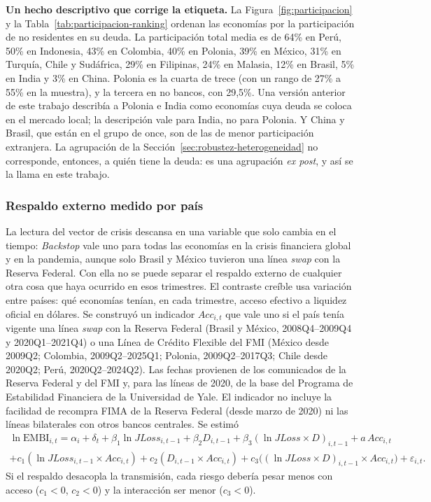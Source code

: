 \textbf{Un hecho descriptivo que corrige la etiqueta.} La Figura~\ref{fig:participacion} y la Tabla~\ref{tab:participacion-ranking} ordenan las economías por la participación de no residentes en su deuda. La participación total media es de 64\% en Perú, 50\% en Indonesia, 43\% en Colombia, 40\% en Polonia, 39\% en México, 31\% en Turquía, Chile y Sudáfrica, 29\% en Filipinas, 24\% en Malasia, 12\% en Brasil, 5\% en India y 3\% en China. Polonia es la cuarta de trece (con un rango de 27\% a 55\% en la muestra), y la tercera en no bancos, con 29,5\%. Una versión anterior de este trabajo describía a Polonia e India como economías cuya deuda se coloca en el mercado local; la descripción vale para India, no para Polonia. Y China y Brasil, que están en el grupo de once, son de las de menor participación extranjera. La agrupación de la Sección~\ref{sec:robustez-heterogeneidad} no corresponde, entonces, a quién tiene la deuda: es una agrupación \textit{ex post}, y así se la llama en este trabajo.

\subsubsection{Respaldo externo medido por país}
\label{sec:respaldo-pais}

La lectura del vector de crisis descansa en una variable que solo cambia en el tiempo: \textit{Backstop} vale uno para todas las economías en la crisis financiera global y en la pandemia, aunque solo Brasil y México tuvieron una línea \textit{swap} con la Reserva Federal. Con ella no se puede separar el respaldo externo de cualquier otra cosa que haya ocurrido en esos trimestres. El contraste creíble usa variación entre países: qué economías tenían, en cada trimestre, acceso efectivo a liquidez oficial en dólares. Se construyó un indicador $Acc_{i,t}$ que vale uno si el país tenía vigente una línea \textit{swap} con la Reserva Federal (Brasil y México, 2008Q4--2009Q4 y 2020Q1--2021Q4) o una Línea de Crédito Flexible del FMI (México desde 2009Q2; Colombia, 2009Q2--2025Q1; Polonia, 2009Q2--2017Q3; Chile desde 2020Q2; Perú, 2020Q2--2024Q2). Las fechas provienen de los comunicados de la Reserva Federal y del FMI y, para las líneas de 2020, de la base del Programa de Estabilidad Financiera de la Universidad de Yale. El indicador no incluye la facilidad de recompra FIMA de la Reserva Federal (desde marzo de 2020) ni las líneas bilaterales con otros bancos centrales. Se estimó
\begin{multline}
\ln\mathrm{EMBI}_{i,t}=\alpha_i+\delta_t+\beta_1\ln JLoss_{i,t-1}+\beta_2D_{i,t-1}+\beta_3(\ln JLoss\times D)_{i,t-1}+a\,Acc_{i,t}\\
+c_1(\ln JLoss_{i,t-1}\times Acc_{i,t})+c_2(D_{i,t-1}\times Acc_{i,t})+c_3\big((\ln JLoss\times D)_{i,t-1}\times Acc_{i,t}\big)+\varepsilon_{i,t}.
\label{eq:respaldo}
\end{multline}
Si el respaldo desacopla la transmisión, cada riesgo debería pesar menos con acceso ($c_1<0$, $c_2<0$) y la interacción ser menor ($c_3<0$).

